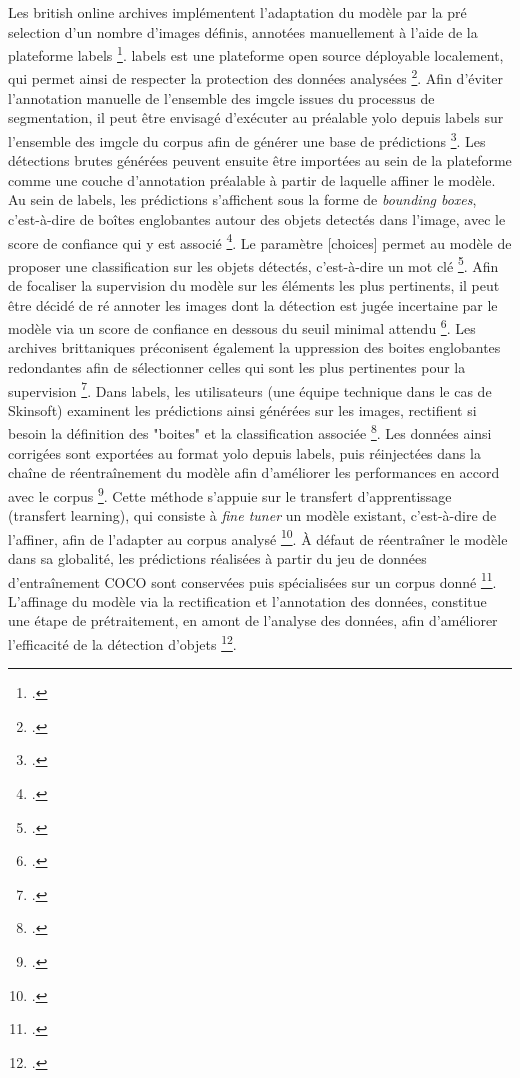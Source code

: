 Les british online archives implémentent l'adaptation du modèle par la pré selection d'un nombre d'images définis, annotées manuellement à l'aide de la plateforme \gls{labels} \footcite{kasturi2024}. \gls{labels} est une plateforme open source déployable localement, qui permet ainsi de respecter la protection des données analysées \footcite{zotero-item-783}.
Afin d'éviter l'annotation manuelle de l'ensemble des \gls{imgcle} issues du processus de segmentation, il peut être envisagé d'exécuter au préalable \gls{yolo} depuis \gls{labels} sur l'ensemble des \gls{imgcle} du corpus afin de générer une base de prédictions \footcite{development2025}. Les détections brutes générées peuvent ensuite être importées au sein de la plateforme comme une couche d'annotation préalable à partir de laquelle affiner le modèle. Au sein de \gls{labels}, les prédictions s'affichent sous la forme de \textit{bounding boxes}, c'est-à-dire de boîtes englobantes autour des objets detectés dans l'image, avec le score de confiance qui y est associé \footcite{kasturi2024}. Le paramètre [choices] permet au modèle de proposer une classification sur les objets détectés, c'est-à-dire un mot clé \footcite{zotero-item-785}. Afin de focaliser la supervision du modèle sur les éléments les plus pertinents, il peut être décidé de ré annoter les images dont la détection est jugée incertaine par le modèle via un score de confiance en dessous du seuil minimal attendu \footcite{development2025}. Les archives brittaniques préconisent également la uppression des boites englobantes redondantes afin de sélectionner celles qui sont les plus pertinentes pour la supervision \footcite{kasturi2024}. Dans \gls{labels}, les utilisateurs (une équipe technique dans le cas de Skinsoft) examinent les prédictions ainsi générées sur les images, rectifient si besoin la définition des "boites" et la classification associée \footcite{kasturi2024}. Les données ainsi corrigées sont exportées au format \gls{yolo} depuis \gls{labels}, puis réinjectées dans la chaîne de réentraînement du modèle afin d'améliorer les performances en accord avec le corpus \footcite{kasturi2024}.
Cette méthode s'appuie sur le transfert d’apprentissage (transfert learning), qui consiste à \textit{fine tuner} un modèle existant, c’est-à-dire de l’affiner, afin de l'adapter au corpus analysé \footcite{bhargav2019}. À défaut de réentraîner le modèle dans sa globalité, les prédictions réalisées à partir du jeu de données d'entraînement COCO sont conservées puis spécialisées sur un corpus donné \footcite{bhargav2019}. L'affinage du modèle via la rectification et l'annotation des données, constitue une étape de prétraitement, en amont de l’analyse des données, afin d'améliorer l'efficacité de la détection d’objets \footcite{kasturi2024}.
